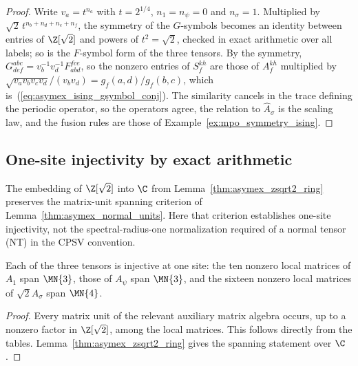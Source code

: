 \begin{proof}
    \leanok
    Write $v_a=t^{n_a}$ with $t=2^{1/4}$, $n_1=n_\psi=0$ and $n_\sigma=1$.
    Multiplied by $\sqrt2\,t^{n_b+n_d+n_e+n_f}$, the symmetry of the
    $G$-symbols becomes an identity between entries of $\Z[\sqrt2]$ and
    powers of $t^2=\sqrt2$, checked in exact arithmetic over all labels; so
    is the $F$-symbol form of the three tensors. By the symmetry,
    $G^{abc}_{def}=v_b^{-1}v_d^{-1}F^{fce}_{abd}$, so the nonzero entries of
    $S_f^{kh}$ are those of $A_f^{kh}$ multiplied by
    $\sqrt{v_av_bv_cv_d}/(v_bv_d)=g_f(a,d)/g_f(b,c)$, which
    is~(\ref{eq:asymex_ising_gsymbol_conj}). The similarity cancels in the
    trace defining the periodic operator, so the operators agree, the
    relation to $\widehat A_\sigma$ is the scaling law, and the fusion rules
    are those of Example~\ref{ex:mpo_symmetry_ising}.
\end{proof}

\subsection{One-site injectivity by exact arithmetic}%
\label{sec:asymex_ising_ring}

The embedding of $\Z[\sqrt2]$ into $\C$ from
Lemma~\ref{thm:asymex_zsqrt2_ring} preserves the matrix-unit spanning
criterion of Lemma~\ref{thm:asymex_normal_units}.
Here that criterion establishes one-site injectivity, not the
spectral-radius-one normalization required of a normal tensor (NT)
in the CPSV convention.

\begin{lemma}%
    \label{thm:asymex_ising_normal}
    \leanok
    Each of the three tensors is injective at one site: the ten nonzero
    local matrices of $A_1$ span $\MN{3}$, those of $A_\psi$ span
    $\MN{3}$, and the sixteen nonzero local matrices of $\sqrt2A_\sigma$
    span $\MN{4}$.
\end{lemma}

\begin{proof}
    \leanok
    Every matrix unit of the relevant auxiliary matrix algebra occurs,
    up to a nonzero factor in $\Z[\sqrt2]$, among the local matrices.
    This follows directly from the tables.
    Lemma~\ref{thm:asymex_zsqrt2_ring} gives the spanning statement
    over $\C$.
\end{proof}


